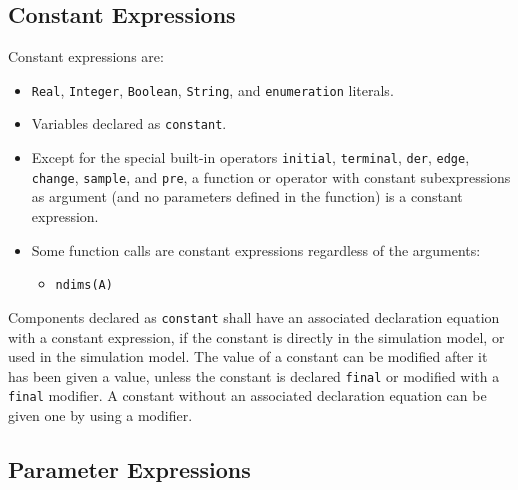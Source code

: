 \subsection{Constant Expressions}\label{constant-expressions}

Constant expressions are:
\begin{itemize}
\item
  \lstinline!Real!, \lstinline!Integer!, \lstinline!Boolean!, \lstinline!String!, and \lstinline!enumeration! literals.
\item
  Variables declared as \lstinline!constant!.
\item
  Except for the special built-in operators \lstinline!initial!, \lstinline!terminal!, \lstinline!der!,
  \lstinline!edge!, \lstinline!change!, \lstinline!sample!, and \lstinline!pre!, a function or operator with constant
  subexpressions as argument (and no parameters defined in the function)
  is a constant expression.
\item
  Some function calls are constant expressions regardless of the arguments:
  \begin{itemize}
  \item
    \lstinline!ndims(A)!
  \end{itemize}
\end{itemize}

Components declared as \lstinline!constant! shall have an associated declaration equation with a constant expression, if the constant is directly in the simulation model, or used in the simulation model.  The value of a constant can be modified after it has been given a value, unless the constant is declared \lstinline!final! or modified with a \lstinline!final! modifier.  A constant without an associated declaration equation can be given one by using a modifier.

\subsection{Parameter Expressions}\label{parameter-expressions}

